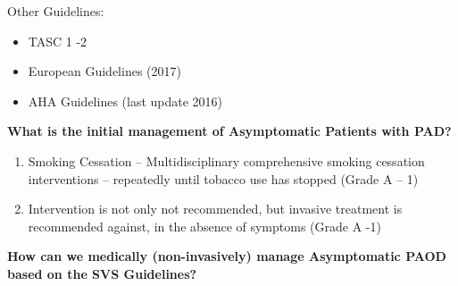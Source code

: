 \documentclass[
]{book}
\providecommand{\tightlist}{%
  \setlength{\itemsep}{0pt}\setlength{\parskip}{0pt}}
\begin{document}
Other Guidelines:

\begin{itemize}
\item
  TASC 1 -2
\item
  European Guidelines (2017)
\item
  AHA Guidelines (last update 2016)
\end{itemize}

\textbf{What is the initial management of Asymptomatic Patients with PAD?}

\begin{enumerate}
\def\labelenumi{\arabic{enumi}.}
\tightlist
\item
  Smoking Cessation -- Multidisciplinary comprehensive smoking
  cessation interventions -- repeatedly until tobacco use has stopped
  (Grade A -- 1)
\item
  Intervention is not only not recommended, but invasive treatment is
  recommended against, in the absence of symptoms (Grade A -1)
\end{enumerate}

\textbf{How can we medically (non-invasively) manage Asymptomatic PAOD based
on the SVS Guidelines?}
\end{document}
